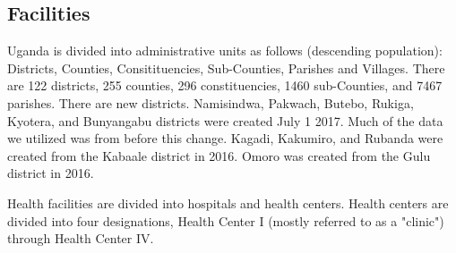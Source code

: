 \documentclass[12pt]{article} %
\begin{document}

\subsection{Facilities} %

Uganda is divided into administrative units as follows (descending population): Districts, Counties, Consitituencies, Sub-Counties, Parishes and Villages. 
There are 122 districts, 255 counties, 296 constituencies, 1460 sub-Counties, and 7467 parishes. There are new districts. Namisindwa, Pakwach, Butebo, Rukiga, Kyotera, and Bunyangabu districts were created July 1 2017. Much of the data we utilized was from before this change. Kagadi, Kakumiro, and Rubanda were created from the Kabaale district in 2016. Omoro was created from the Gulu district in 2016.

Health facilities are divided into hospitals and health centers. Health centers are divided into four designations, Health Center I (mostly referred to as a "clinic") through Health Center IV. \cite{UBS2017}
\end{document}

